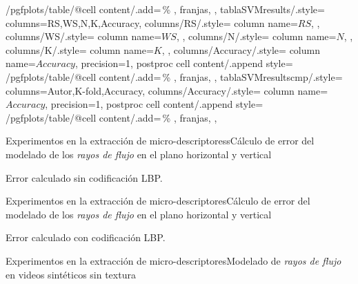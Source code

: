 \documentclass{beamer}
\begin{document}
{{{{					/pgfplots/table/@cell content/.add={}{\,\%}
				}
			},
			franjas,
		},
		tablaSVMresults/.style={
			columns={RS,WS,N,K,Accuracy},
			columns/RS/.style={
				column name=$RS$,
			},
			columns/WS/.style={
				column name=$WS$,
			},
			columns/N/.style={
				column name=$N$,
			},
			columns/K/.style={
				column name=$K$,
			},
			columns/Accuracy/.style={
				column name=$Accuracy$,
				precision=1,
				postproc cell content/.append style={
					/pgfplots/table/@cell content/.add={}{\,\%}
				}
			},
			franjas,
		},
		tablaSVMresultscmp/.style={
			columns={Autor,K-fold,Accuracy},
			columns/Accuracy/.style={
				column name=$Accuracy$,
				precision=1,
				postproc cell content/.append style={
					/pgfplots/table/@cell content/.add={}{\,\%}
				}
			},
			franjas,
		},
	}
	
	\begin{frame}{Experimentos en la extracción de micro-descriptoress}{Cálculo de error del modelado de los \textit{rayos de flujo} en el plano horizontal y vertical}
		\begin{table}[tb]
			\centering
			\caption{Error calculado sin codificación LBP.}
			\label{tabla:error_no_lbp}
		\end{table}
	\end{frame}
	
	\begin{frame}{Experimentos en la extracción de micro-descriptores}{Cálculo de error del modelado de los \textit{rayos de flujo} en el plano horizontal y vertical}
		\begin{table}[tb]
			\centering
			\caption{Error calculado con codificación LBP.}
			\label{tabla:error_lbp}
		\end{table}
	\end{frame}


	\begin{frame}{Experimentos en la extracción de micro-descriptores}{Modelado de \textit{rayos de flujo} en videos sintéticos sin textura}
		\begin{center}
		\end{center}		
	\end{frame}	
	
\end{document}
